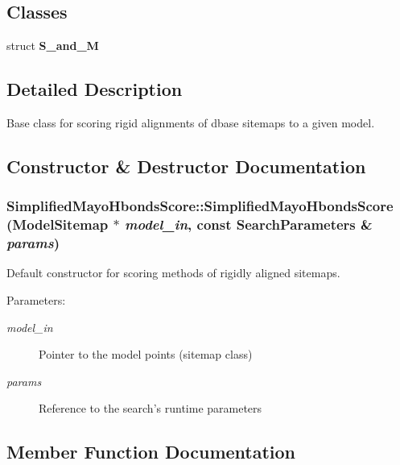 \subsection*{Classes}
\begin{CompactItemize}
\item 
struct \textbf{S\_\-and\_\-M}
\end{CompactItemize}


\subsection{Detailed Description}
Base class for scoring rigid alignments of dbase sitemaps to a given model. 



\subsection{Constructor \& Destructor Documentation}
\subsubsection{\setlength{\rightskip}{0pt plus 5cm}Simplified\-Mayo\-Hbonds\-Score::Simplified\-Mayo\-Hbonds\-Score (\bf{Model\-Sitemap} $\ast$ {\em model\_\-in}, const \bf{Search\-Parameters} \& {\em params})}\label{classSimSite3D_1_1SimplifiedMayoHbondsScore_70771cd00d33a3ee88c11bbb36ae5068}


Default constructor for scoring methods of rigidly aligned sitemaps. 

\begin{Desc}
\item[Parameters:]
\begin{description}
\item[{\em model\_\-in}]Pointer to the model points (sitemap class) \item[{\em params}]Reference to the search's runtime parameters \end{description}
\end{Desc}


\subsection{Member Function Documentation}
